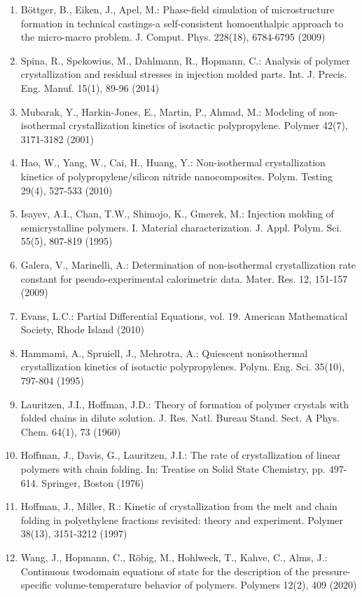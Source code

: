 \documentclass[10pt]{article}
\begin{document}
\begin{enumerate}
  \item Böttger, B., Eiken, J., Apel, M.: Phase-field simulation of microstructure formation in technical castings-a self-consistent homoenthalpic approach to the micro-macro problem. J. Comput. Phys. 228(18), 6784-6795 (2009)

  \item Spina, R., Spekowius, M., Dahlmann, R., Hopmann, C.: Analysis of polymer crystallization and residual stresses in injection molded parts. Int. J. Precis. Eng. Manuf. 15(1), 89-96 (2014)

  \item Mubarak, Y., Harkin-Jones, E., Martin, P., Ahmad, M.: Modeling of non-isothermal crystallization kinetics of isotactic polypropylene. Polymer 42(7), 3171-3182 (2001)

  \item Hao, W., Yang, W., Cai, H., Huang, Y.: Non-isothermal crystallization kinetics of polypropylene/silicon nitride nanocomposites. Polym. Testing 29(4), 527-533 (2010)

  \item Isayev, A.I., Chan, T.W., Shimojo, K., Gmerek, M.: Injection molding of semicrystalline polymers. I. Material characterization. J. Appl. Polym. Sci. 55(5), 807-819 (1995)

  \item Galera, V., Marinelli, A.: Determination of non-isothermal crystallization rate constant for pseudo-experimental calorimetric data. Mater. Res. 12, 151-157 (2009)

  \item Evans, L.C.: Partial Differential Equations, vol. 19. American Mathematical Society, Rhode Island (2010)

  \item Hammami, A., Spruiell, J., Mehrotra, A.: Quiescent nonisothermal crystallization kinetics of isotactic polypropylenes. Polym. Eng. Sci. 35(10), 797-804 (1995)

  \item Lauritzen, J.I., Hoffman, J.D.: Theory of formation of polymer crystals with folded chains in dilute solution. J. Res. Natl. Bureau Stand. Sect. A Phys. Chem. 64(1), 73 (1960)

  \item Hoffman, J., Davis, G., Lauritzen, J.I.: The rate of crystallization of linear polymers with chain folding. In: Treatise on Solid State Chemistry, pp. 497-614. Springer, Boston (1976)

  \item Hoffman, J., Miller, R.: Kinetic of crystallization from the melt and chain folding in polyethylene fractions revisited: theory and experiment. Polymer 38(13), 3151-3212 (1997)

  \item Wang, J., Hopmann, C., Röbig, M., Hohlweck, T., Kahve, C., Alms, J.: Continuous twodomain equations of state for the description of the pressure-specific volume-temperature behavior of polymers. Polymers 12(2), 409 (2020)

\end{enumerate}
\end{document}
